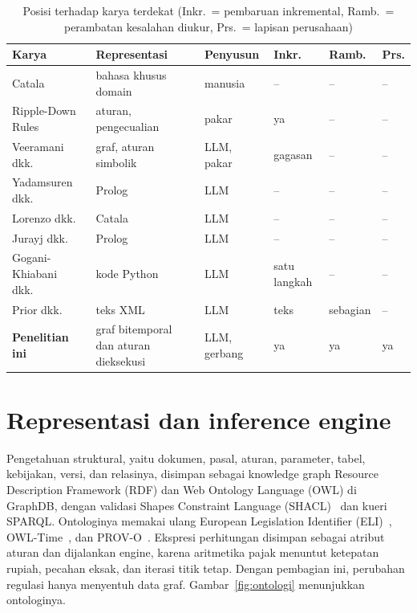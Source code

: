 \documentclass[conference]{IEEEtran}
\makeatletter
\DeclareRobustCommand{\en}[1]{{\usefont{\f@encoding}{\f@family}{\f@series}{it}#1\/}}
\makeatother
\begin{document}
\begin{table}[t]
\centering
\caption{Posisi terhadap karya terdekat (Inkr.\ = pembaruan inkremental, Ramb.\ = perambatan kesalahan diukur, Prs.\ = lapisan perusahaan)}
\label{tab:posisi}
\scriptsize
\setlength{\tabcolsep}{3pt}
\begin{tabularx}{\columnwidth}{@{}P{2.15cm} L P{1.1cm} P{0.85cm} P{0.9cm} P{0.45cm}@{}}
\toprule
\textbf{Karya} & \textbf{Representasi} & \textbf{Penyusun} & \textbf{Inkr.} & \textbf{Ramb.} & \textbf{Prs.} \\
\midrule
Catala~\cite{merigoux2021catala} & bahasa khusus domain & manusia & -- & -- & -- \\
\en{Ripple-Down Rules}~\cite{compton2021rdr} & aturan, pengecualian & pakar & ya & -- & -- \\
Veeramani dkk.~\cite{veeramani2026neurosymbolic} & graf, aturan simbolik & LLM, pakar & gagasan & -- & -- \\
Yadamsuren dkk.~\cite{yadamsuren2026formalization} & Prolog & LLM & -- & -- & -- \\
Lorenzo dkk.~\cite{lorenzo2025translating} & Catala & LLM & -- & -- & -- \\
Jurayj dkk.~\cite{jurayj2026tax} & Prolog & LLM & -- & -- & -- \\
Gogani-Khiabani dkk.~\cite{goganikhiabani2025maintaining} & kode Python & LLM & satu langkah & -- & -- \\
Prior dkk.~\cite{prior2025risks} & teks XML & LLM & teks & sebagian & -- \\
\midrule
\textbf{Penelitian ini} & graf bitemporal dan aturan dieksekusi & LLM, gerbang & ya & ya & ya \\
\bottomrule
\end{tabularx}
\end{table}

\section{Representasi dan \en{inference engine}}
\label{sec:representasi}
Pengetahuan struktural, yaitu dokumen, pasal, aturan, parameter, tabel, kebijakan, versi, dan relasinya, disimpan sebagai \en{knowledge graph} \en{Resource Description Framework} (RDF) dan \en{Web Ontology Language} (OWL) di GraphDB, dengan validasi \en{Shapes Constraint Language} (SHACL)~\cite{knublauch2017shacl} dan kueri SPARQL. Ontologinya memakai ulang \en{European Legislation Identifier} (ELI)~\cite{publicationsoffice2026eli}, OWL-Time~\cite{cox2017owltime}, dan PROV-O~\cite{lebo2013provo}. Ekspresi perhitungan disimpan sebagai atribut aturan dan dijalankan \en{engine}, karena aritmetika pajak menuntut ketepatan rupiah, pecahan eksak, dan iterasi titik tetap. Dengan pembagian ini, perubahan regulasi hanya menyentuh data graf. Gambar~\ref{fig:ontologi} menunjukkan ontologinya.
\end{document}
